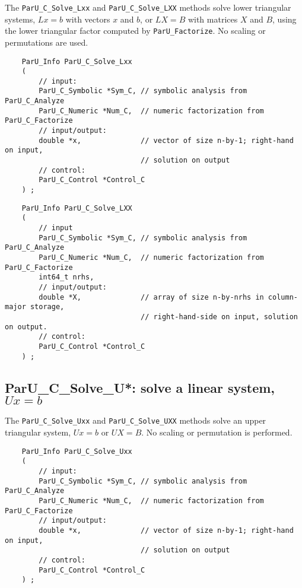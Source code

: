 \documentclass[12pt]{article}
\begin{document}
    The \verb'ParU_C_Solve_Lxx' and \verb'ParU_C_Solve_LXX' methods solve lower
    triangular systems, $Lx=b$ with vectors $x$ and $b$, or $LX=B$ with
    matrices $X$ and $B$, using the lower triangular factor computed by
    \verb'ParU_Factorize'.  No scaling or permutations are used.

    {\footnotesize
    \begin{verbatim}
    ParU_Info ParU_C_Solve_Lxx
    (
        // input:
        ParU_C_Symbolic *Sym_C, // symbolic analysis from ParU_C_Analyze
        ParU_C_Numeric *Num_C,  // numeric factorization from ParU_C_Factorize
        // input/output:
        double *x,              // vector of size n-by-1; right-hand on input,
                                // solution on output
        // control:
        ParU_C_Control *Control_C
    ) ; \end{verbatim} }

    {\footnotesize
    \begin{verbatim}
    ParU_Info ParU_C_Solve_LXX
    (
        // input
        ParU_C_Symbolic *Sym_C, // symbolic analysis from ParU_C_Analyze
        ParU_C_Numeric *Num_C,  // numeric factorization from ParU_C_Factorize
        int64_t nrhs,
        // input/output:
        double *X,              // array of size n-by-nrhs in column-major storage,
                                // right-hand-side on input, solution on output.
        // control:
        ParU_C_Control *Control_C
    ) ; \end{verbatim} }

\subsection{{\sf ParU\_C\_Solve\_U*}: solve a linear system, $Ux=b$}

    The \verb'ParU_C_Solve_Uxx' and \verb'ParU_C_Solve_UXX' methods solve an
    upper triangular system, $Ux=b$ or $UX=B$.  No scaling or permutation is
    performed.

    {\footnotesize
    \begin{verbatim}
    ParU_Info ParU_C_Solve_Uxx
    (
        // input:
        ParU_C_Symbolic *Sym_C, // symbolic analysis from ParU_C_Analyze
        ParU_C_Numeric *Num_C,  // numeric factorization from ParU_C_Factorize
        // input/output:
        double *x,              // vector of size n-by-1; right-hand on input,
                                // solution on output
        // control:
        ParU_C_Control *Control_C
    ) ; \end{verbatim} }
\end{document}
